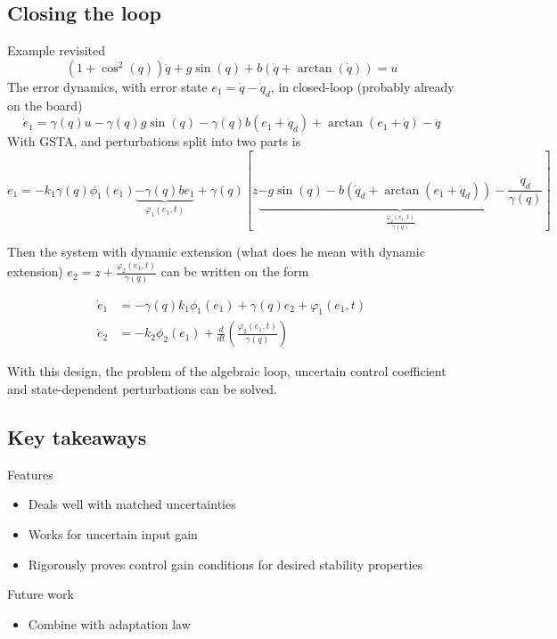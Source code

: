 \subsection{Closing the loop}
Example revisited
\begin{equation*}
    \left(1 + \cos^2(q)\right)\ddot{q} + g\sin(q) + b\left(\dot{q} + \arctan (\dot{q})\right) = u
\end{equation*}
The error dynamics, with error state $e_1 = \dot{q} - \dot{q}_d$, in closed-loop (probably already on the board)
\begin{equation}
    \dot{e}_1 = \gamma(q)u - \gamma(q)g\sin(q) - \gamma(q)b(e_1 + \dot{q}_d) + \arctan(e_1 + \dot{q}) - \ddot{q}
\end{equation}
With GSTA, and perturbations split into two parts is 
\begin{equation}
    \dot{e}_1 = -k_1\gamma(q)\phi_1(e_1)
    \underbrace{
        - \gamma(q)be_1
    }_{\varphi_1(e_1, t)} 
    + \gamma(q)
    \left[z
    \underbrace{
        - g\sin(q) - b\left(\dot{q}_d + \arctan(e_1 + \dot{q}_d)\right) - \frac{\ddot{q}_d}{\gamma(q)}
    }_{\frac{\varphi_2(e_1, t)}{\gamma(q)}}
    \right]
\end{equation}

Then the system with dynamic extension (what does he mean with dynamic extension) $e_2 = z + \frac{\varphi_2(e_1, t)}{\gamma(q)}$ can be written on the form

\begin{equation}
    \begin{split}
        \dot{e}_1 &= -\gamma(q)k_1\phi_1(e_1) + \gamma(q)e_2 + \varphi_1(e_1, t) \\
        \dot{e}_2 &= -k_2\phi_2(e_1) + \frac{d}{dt}\left(\frac{\varphi_2(e_1, t)}{\gamma(q)}\right)
    \end{split}
\end{equation}

With this design, the problem of the algebraic loop, uncertain control coefficient and state-dependent perturbations can be solved.

\subsection{Key takeaways}
Features
\begin{itemize}
    \item Deals well with matched uncertainties
    \item Works for uncertain input gain
    \item Rigorously proves control gain conditions for desired stability properties
\end{itemize}
Future work
\begin{itemize}
    \item Combine with adaptation law
\end{itemize}
